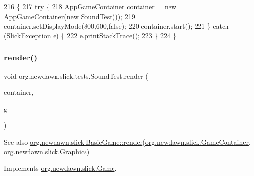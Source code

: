 \begin{DoxyCode}
216                                            \{
217         \textcolor{keywordflow}{try} \{
218             AppGameContainer container = \textcolor{keyword}{new} AppGameContainer(\textcolor{keyword}{new} \mbox{\hyperlink{classorg_1_1newdawn_1_1slick_1_1tests_1_1_sound_test_a6eb15c813a7fdcc4560146923906e87a}{SoundTest}}());
219             container.setDisplayMode(800,600,\textcolor{keyword}{false});
220             container.start();
221         \} \textcolor{keywordflow}{catch} (SlickException e) \{
222             e.printStackTrace();
223         \}
224     \}
\end{DoxyCode}
\mbox{\label{classorg_1_1newdawn_1_1slick_1_1tests_1_1_sound_test_a03f1bed74a67b67de72d4ad040dee2b9}} 
\subsubsection{\texorpdfstring{render()}{render()}}
{\footnotesize\ttfamily void org.\+newdawn.\+slick.\+tests.\+Sound\+Test.\+render (\begin{DoxyParamCaption}\item[{\mbox{\hyperlink{classorg_1_1newdawn_1_1slick_1_1_game_container}{Game\+Container}}}]{container,  }\item[{\mbox{\hyperlink{classorg_1_1newdawn_1_1slick_1_1_graphics}{Graphics}}}]{g }\end{DoxyParamCaption})\hspace{0.3cm}{\ttfamily [inline]}}

\begin{DoxySeeAlso}{See also}
\mbox{\hyperlink{interfaceorg_1_1newdawn_1_1slick_1_1_game_af1a4670d43eb3ba04dfcf55ab1975b64}{org.\+newdawn.\+slick.\+Basic\+Game\+::render}}(\mbox{\hyperlink{classorg_1_1newdawn_1_1slick_1_1_game_container}{org.\+newdawn.\+slick.\+Game\+Container}}, \mbox{\hyperlink{classorg_1_1newdawn_1_1slick_1_1_graphics}{org.\+newdawn.\+slick.\+Graphics}}) 
\end{DoxySeeAlso}


Implements \mbox{\hyperlink{interfaceorg_1_1newdawn_1_1slick_1_1_game_af1a4670d43eb3ba04dfcf55ab1975b64}{org.\+newdawn.\+slick.\+Game}}.


